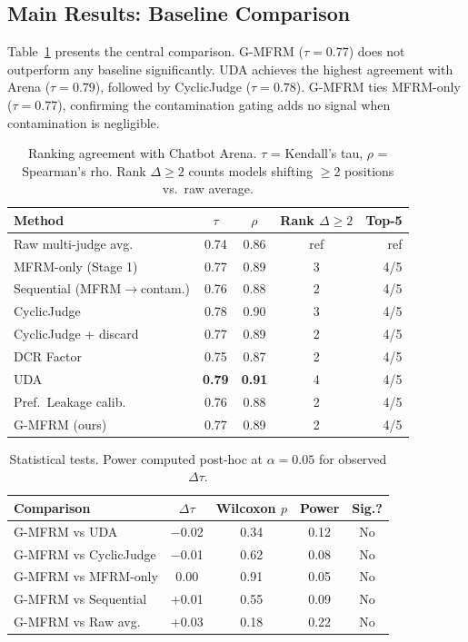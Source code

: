 \documentclass[11pt]{article}
\begin{document}
\subsection{Main Results: Baseline Comparison}
\label{sec:baselines}

Table~\ref{tab:main} presents the central comparison.
G-MFRM ($\tau = 0.77$) does not outperform any baseline significantly.
UDA achieves the highest agreement with Arena ($\tau = 0.79$), followed by CyclicJudge ($\tau = 0.78$).
G-MFRM ties MFRM-only ($\tau = 0.77$), confirming the contamination gating adds no signal when contamination is negligible.

\begin{table}[t]
\centering
\small
\caption{Ranking agreement with Chatbot Arena. $\tau$ = Kendall's tau, $\rho$ = Spearman's rho. Rank $\Delta{\geq}2$ counts models shifting $\geq$2 positions vs.\ raw average.}
\label{tab:main}
\begin{tabular}{lcccr}
\toprule
\textbf{Method} & $\tau$ & $\rho$ & \textbf{Rank $\Delta{\geq}2$} & \textbf{Top-5} \\
\midrule
Raw multi-judge avg. & 0.74 & 0.86 & ref & ref \\
MFRM-only (Stage 1) & 0.77 & 0.89 & 3 & 4/5 \\
Sequential (MFRM$\rightarrow$contam.) & 0.76 & 0.88 & 2 & 4/5 \\
CyclicJudge & 0.78 & 0.90 & 3 & 4/5 \\
CyclicJudge + discard & 0.77 & 0.89 & 2 & 4/5 \\
DCR Factor & 0.75 & 0.87 & 2 & 4/5 \\
UDA & \textbf{0.79} & \textbf{0.91} & 4 & 4/5 \\
Pref.\ Leakage calib. & 0.76 & 0.88 & 2 & 4/5 \\
G-MFRM (ours) & 0.77 & 0.89 & 2 & 4/5 \\
\bottomrule
\end{tabular}
\end{table}

\begin{table}[t]
\centering
\small
\caption{Statistical tests. Power computed post-hoc at $\alpha = 0.05$ for observed $\Delta\tau$.}
\label{tab:stats}
\begin{tabular}{lcccc}
\toprule
\textbf{Comparison} & $\Delta\tau$ & \textbf{Wilcoxon $p$} & \textbf{Power} & \textbf{Sig.?} \\
\midrule
G-MFRM vs UDA & $-$0.02 & 0.34 & 0.12 & No \\
G-MFRM vs CyclicJudge & $-$0.01 & 0.62 & 0.08 & No \\
G-MFRM vs MFRM-only & 0.00 & 0.91 & 0.05 & No \\
G-MFRM vs Sequential & +0.01 & 0.55 & 0.09 & No \\
G-MFRM vs Raw avg. & +0.03 & 0.18 & 0.22 & No \\
\bottomrule
\end{tabular}
\end{table}
\end{document}

